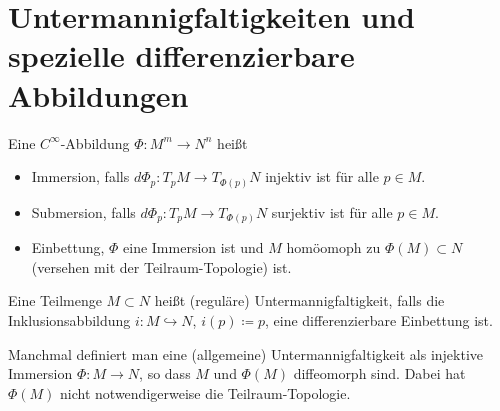 \documentclass[a4paper,twoside,DIV15,BCOR12mm]{scrbook}
\renewcommand{\da}{\coloneqq}
\begin{document}
\section{Untermannigfaltigkeiten und spezielle differenzierbare Abbildungen}

Eine $C^\infty$-Abbildung $\Phi:M^m\to N^n$ heißt 
\begin{itemize}
\item Immersion, falls $d\Phi_p: T_pM \to T_{\Phi(p)}N$ injektiv ist für alle $p\in M$.
\item Submersion, falls $d\Phi_p: T_pM \to T_{\Phi(p)}N$ surjektiv ist für alle $p\in M$.
\item Einbettung, $\Phi$ eine Immersion ist und $M$ homöomoph zu $\Phi(M)\subset N$ (versehen mit der Teilraum-Topologie) ist. 
\end{itemize}

Eine Teilmenge $M\subset N$ heißt (reguläre) Untermannigfaltigkeit, falls die Inklusionsabbildung $i:M\hookrightarrow N$, $i(p) \da p$, eine differenzierbare Einbettung ist.

Manchmal definiert man eine (allgemeine) Untermannigfaltigkeit als injektive Immersion $\Phi:M\to N$, so dass $M$ und $\Phi(M)$ diffeomorph sind. Dabei hat $\Phi(M)$ nicht notwendigerweise die Teilraum-Topologie.
\end{document}
